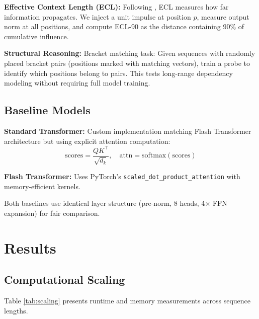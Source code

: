 \documentclass{article}
\begin{document}
\textbf{Effective Context Length (ECL):}
Following \citet{sun2023retentive}, ECL measures how far information propagates. We inject a unit impulse at position $p$, measure output norm at all positions, and compute ECL-90 as the distance containing 90\% of cumulative influence.

\textbf{Structural Reasoning:}
Bracket matching task: Given sequences with randomly placed bracket pairs (positions marked with matching vectors), train a probe to identify which positions belong to pairs. This tests long-range dependency modeling without requiring full model training.

\subsection{Baseline Models}

\textbf{Standard Transformer:} Custom implementation matching Flash Transformer architecture but using explicit attention computation:
\begin{equation}
\text{scores} = \frac{QK^\top}{\sqrt{d_k}}, \quad \text{attn} = \text{softmax}(\text{scores})
\end{equation}

\textbf{Flash Transformer:} Uses PyTorch's \texttt{scaled\_dot\_product\_attention} with memory-efficient kernels.

Both baselines use identical layer structure (pre-norm, 8 heads, 4$\times$ FFN expansion) for fair comparison.

\section{Results}

\subsection{Computational Scaling}

Table \ref{tab:scaling} presents runtime and memory measurements across sequence lengths.
\end{document}
